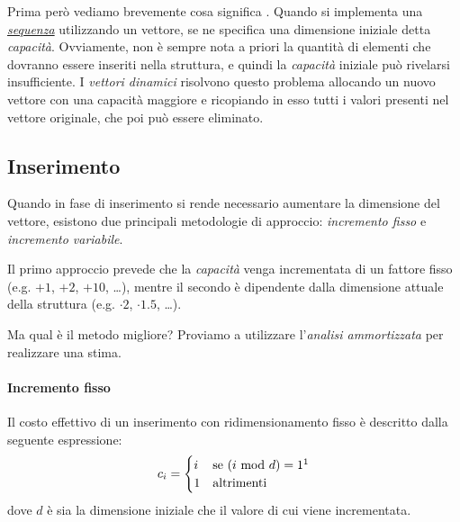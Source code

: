 Prima però vediamo brevemente cosa significa . Quando si implementa una \emph{\hyperref[def:27]{sequenza}}
utilizzando un vettore, se ne specifica una dimensione iniziale detta
\emph{capacità}. Ovviamente, non è sempre nota a priori la quantità di elementi
che dovranno essere inseriti nella struttura, e quindi la \emph{capacità} iniziale
può rivelarsi insufficiente. I \emph{vettori dinamici} risolvono questo problema
allocando un nuovo vettore con una capacità maggiore e ricopiando in esso tutti
i valori presenti nel vettore originale, che poi può essere eliminato.

\subsection{Inserimento}
Quando in fase di inserimento si rende necessario aumentare la dimensione del
vettore, esistono due principali metodologie di approccio: \emph{incremento fisso}
e \emph{incremento variabile}.

Il primo approccio prevede che la \emph{capacità} venga incrementata di un fattore
fisso (e.g. $+1$, $+2$, $+10$, \dots), mentre il secondo è dipendente dalla dimensione
attuale della struttura (e.g. $\cdot2$, $\cdot1.5$, \dots).

Ma qual è il metodo migliore? Proviamo a utilizzare l'\emph{analisi ammortizzata}
per realizzare una stima.

\paragraph{Incremento fisso}
Il costo effettivo di un inserimento con ridimensionamento fisso è descritto
dalla seguente espressione:
\[c_i=\begin{cases}
    i & \text{se}\ (i\Mod{d}) = 1\footnotemark\\
    1 & \text{altrimenti}
\end{cases}\]
dove $d$ è sia la dimensione iniziale che il valore di cui viene incrementata.

